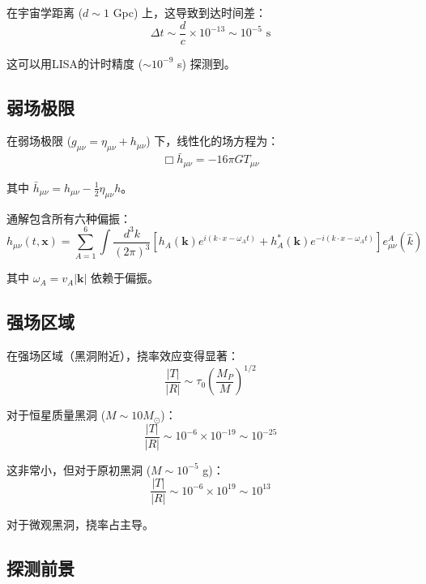 在宇宙学距离 ($d \sim 1$ Gpc) 上，这导致到达时间差：
\begin{equation}
    \Delta t \sim \frac{d}{c} \times 10^{-13} \sim 10^{-5} \text{ s}
\end{equation}

这可以用LISA的计时精度 ($\sim 10^{-9}$ s) 探测到。

\subsection{弱场极限}

在弱场极限 ($g_{\mu\nu} = \eta_{\mu\nu} + h_{\mu\nu}$) 下，线性化的场方程为：
\begin{equation}
    \Box \bar{h}_{\mu\nu} = -16\pi G T_{\mu\nu}
\end{equation}

其中 $\bar{h}_{\mu\nu} = h_{\mu\nu} - \frac{1}{2}\eta_{\mu\nu}h$。

通解包含所有六种偏振：
\begin{equation}
    h_{\mu\nu}(t,\mathbf{x}) = \sum_{A=1}^6 \int \frac{d^3k}{(2\pi)^3} \left[ h_A(\mathbf{k}) e^{i(k \cdot x - \omega_A t)} + h_A^*(\mathbf{k}) e^{-i(k \cdot x - \omega_A t)} \right] e^A_{\mu\nu}(\hat{k})
\end{equation}

其中 $\omega_A = v_A |\mathbf{k}|$ 依赖于偏振。

\subsection{强场区域}

在强场区域（黑洞附近），挠率效应变得显著：
\begin{equation}
    \frac{|T|}{|R|} \sim \tau_0 \left(\frac{M_P}{M}\right)^{1/2}
\end{equation}

对于恒星质量黑洞 ($M \sim 10 M_\odot$)：
\begin{equation}
    \frac{|T|}{|R|} \sim 10^{-6} \times 10^{-19} \sim 10^{-25}
\end{equation}

这非常小，但对于原初黑洞 ($M \sim 10^{-5}$ g)：
\begin{equation}
    \frac{|T|}{|R|} \sim 10^{-6} \times 10^{19} \sim 10^{13}
\end{equation}

对于微观黑洞，挠率占主导。

\subsection{探测前景}

